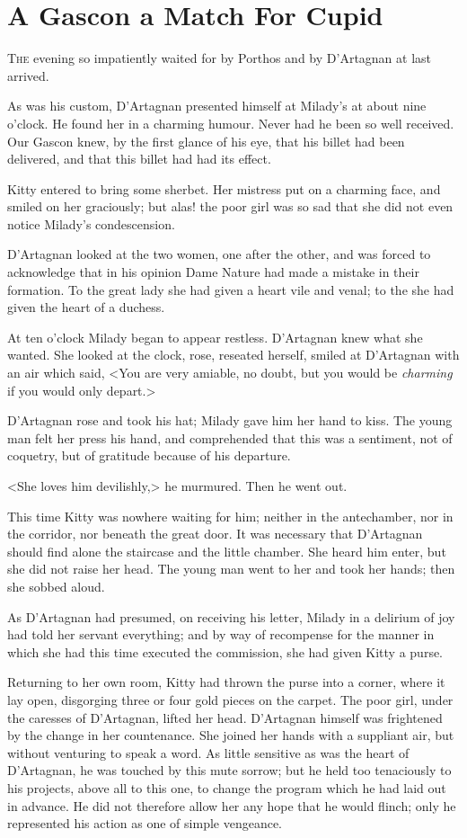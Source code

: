 
\chapter{A Gascon a Match For Cupid}

\lettrine{T}{he} evening so impatiently waited for by Porthos and by D'Artagnan at last arrived. 

\zz
As was his custom, D'Artagnan presented himself at Milady's at about nine o'clock. He found her in a charming humour. Never had he been so well received. Our Gascon knew, by the first glance of his eye, that his billet had been delivered, and that this billet had had its effect. 

Kitty entered to bring some sherbet. Her mistress put on a charming face, and smiled on her graciously; but alas! the poor girl was so sad that she did not even notice Milady's condescension. 

D'Artagnan looked at the two women, one after the other, and was forced to acknowledge that in his opinion Dame Nature had made a mistake in their formation. To the great lady she had given a heart vile and venal; to the  she had given the heart of a duchess. 

At ten o'clock Milady began to appear restless. D'Artagnan knew what she wanted. She looked at the clock, rose, reseated herself, smiled at D'Artagnan with an air which said, <You are very amiable, no doubt, but you would be \emph{charming} if you would only depart.> 

D'Artagnan rose and took his hat; Milady gave him her hand to kiss. The young man felt her press his hand, and comprehended that this was a sentiment, not of coquetry, but of gratitude because of his departure. 

<She loves him devilishly,> he murmured. Then he went out. 

This time Kitty was nowhere waiting for him; neither in the antechamber, nor in the corridor, nor beneath the great door. It was necessary that D'Artagnan should find alone the staircase and the little chamber. She heard him enter, but she did not raise her head. The young man went to her and took her hands; then she sobbed aloud. 

As D'Artagnan had presumed, on receiving his letter, Milady in a delirium of joy had told her servant everything; and by way of recompense for the manner in which she had this time executed the commission, she had given Kitty a purse. 

Returning to her own room, Kitty had thrown the purse into a corner, where it lay open, disgorging three or four gold pieces on the carpet. The poor girl, under the caresses of D'Artagnan, lifted her head. D'Artagnan himself was frightened by the change in her countenance. She joined her hands with a suppliant air, but without venturing to speak a word. As little sensitive as was the heart of D'Artagnan, he was touched by this mute sorrow; but he held too tenaciously to his projects, above all to this one, to change the program which he had laid out in advance. He did not therefore allow her any hope that he would flinch; only he represented his action as one of simple vengeance. 

